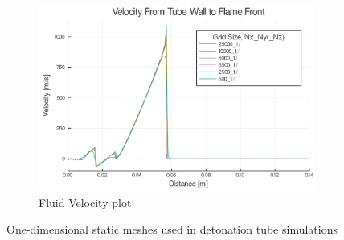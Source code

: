 \begin{figure} \ContinuedFloat
    
    \begin{subfigure}[]{\textwidth}
        \centering
        \includegraphics[width=\textwidth]{./figs/static1d/u.png}
        \caption{Fluid Velocity plot}
    \end{subfigure}

    \caption{One-dimensional static meshes used in detonation tube simulations}
    \label{fig:1dstatic}
\end{figure}

